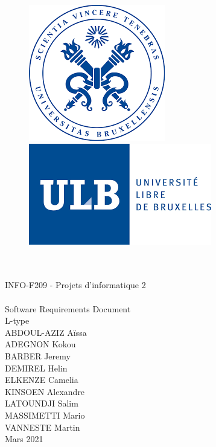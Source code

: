 \documentclass[a4paper,12pt]{article}
\begin{document}
    \begin{titlepage}

        \begin{center}
        
            \begin{figure}[H]
              \begin{minipage}[c]{.46\linewidth}
                    \centering
                    \includegraphics[scale = 0.3]{images/sceau_ulb.png}
                \end{minipage}
                \hfill%
                \begin{minipage}[c]{.46\linewidth}
                    \centering
                    \includegraphics[scale=0.5]{images/logo_ulb.png}
                \end{minipage}
            \end{figure}
        
            {\\[2 cm] \Huge\\INFO-F209 - Projets d'informatique 2 \\ \\ Software Requirements Document \\ [1 cm]
            L-type\\[2 cm]}
            {ABDOUL-AZIZ Aïssa \\[0,2 cm] ADEGNON Kokou  \\[0,2 cm] BARBER Jeremy \\[0,2 cm] DEMIREL Helin \\[0,2 cm] ELKENZE Camelia  \\[0,2 cm] KINSOEN Alexandre  \\[0,2 cm] LATOUNDJI Salim  \\[0,2 cm] MASSIMETTI Mario  \\[0,2 cm] VANNESTE Martin  \\ [3 cm] Mars 2021}

        \end{center}

    \end{titlepage}
\end{document}
